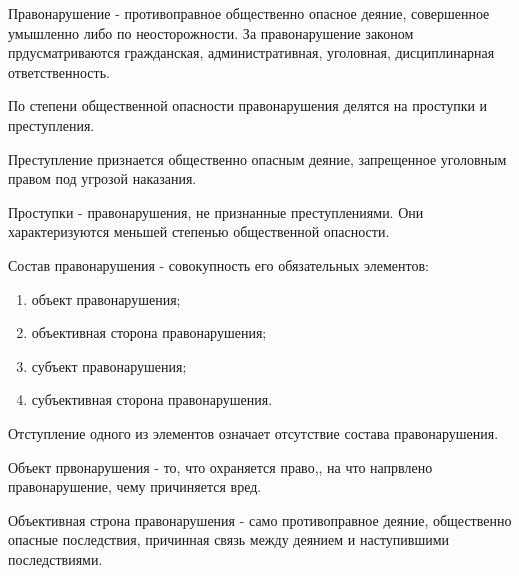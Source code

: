 Правонарушение - противоправное общественно опасное деяние, совершенное умышленно либо по неосторожности. За правонарушение законом прдусматриваются гражданская, административная, уголовная, дисциплинарная ответственность.

По степени общественной опасности правонарушения делятся на проступки и преступления.

Преступление признается общественно опасным деяние, запрещенное уголовным правом под угрозой наказания.

Проступки - правонарушения, не признанные преступлениями. Они характеризуются меньшей степенью общественной опасности.

Состав правонарушения - совокупность его обязательных элементов:
\begin{enumerate}
	\item объект правонарушения;
	\item объективная сторона правонарушения;
	\item субъект правонарушения;
	\item субъективная сторона правонарушения.
\end{enumerate}

Отступление одного из элементов означает отсутствие состава правонарушения.

Объект првонарушения - то, что охраняется право,, на что напрвлено правонарушение, чему причиняется вред.

Объективная строна правонарушения - само противоправное деяние, общественно опасные последствия, причинная связь между деянием и наступившими последствиями.